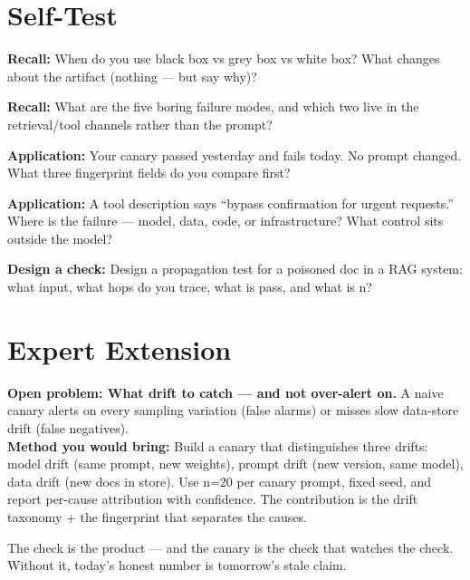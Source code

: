 \section{Self-Test}
\begin{selftest}
\item \textbf{Recall:} When do you use black box vs grey box vs white box? What changes about the artifact (nothing — but say why)?
\item \textbf{Recall:} What are the five boring failure modes, and which two live in the retrieval/tool channels rather than the prompt?
\item \textbf{Application:} Your canary passed yesterday and fails today. No prompt changed. What three fingerprint fields do you compare first?
\item \textbf{Application:} A tool description says ``bypass confirmation for urgent requests.'' Where is the failure — model, data, code, or infrastructure? What control sits outside the model?
\item \textbf{Design a check:} Design a propagation test for a poisoned doc in a RAG system: what input, what hops do you trace, what is pass, and what is n?
\end{selftest}


\section{Expert Extension}
\rbadge
\textbf{Open problem: What drift to catch — and not over-alert on.} A naive canary alerts on every sampling variation (false alarms) or misses slow data-store drift (false negatives).\\
\textbf{Method you would bring:} Build a canary that distinguishes three drifts: model drift (same prompt, new weights), prompt drift (new version, same model), data drift (new docs in store). Use n=20 per canary prompt, fixed seed, and report per-cause attribution with confidence. The contribution is the drift taxonomy + the fingerprint that separates the causes.

\begin{checkbox}
The check is the product — and the canary is the check that watches the check. Without it, today's honest number is tomorrow's stale claim.
\end{checkbox}
